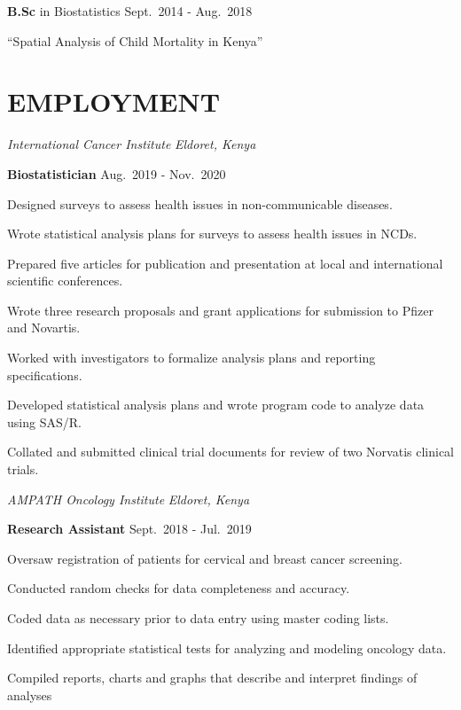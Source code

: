 \documentclass[13pt,]{article}
\providecommand{\tightlist}{%
  \setlength{\itemsep}{0pt}\setlength{\parskip}{0pt}}
\renewenvironment{itemize}{
  \begin{list}{}{
    \setlength{\leftmargin}{1.5em}
  }
}{
  \end{list}
}
\begin{document}
\begin{itemize}
\item
  \textbf{B.Sc} in Biostatistics \hfill Sept.~2014 - Aug.~2018

  \begin{itemize}
  \tightlist
  \item
    ``Spatial Analysis of Child Mortality in Kenya''
  \end{itemize}
\end{itemize}

\hypertarget{employment}{%
\section{\texorpdfstring{\textbf{EMPLOYMENT}}{EMPLOYMENT}}\label{employment}}

\emph{International Cancer Institute} \hfill \emph{Eldoret, Kenya}

\textbf{Biostatistician} \hfill Aug.~2019 - Nov.~2020

\begin{itemize}
\tightlist
\item
  Designed surveys to assess health issues in non-communicable diseases.
\item
  Wrote statistical analysis plans for surveys to assess health issues
  in NCDs.
\item
  Prepared five articles for publication and presentation at local and
  international scientific conferences.
\item
  Wrote three research proposals and grant applications for submission
  to Pfizer and Novartis.
\item
  Worked with investigators to formalize analysis plans and reporting
  specifications.
\item
  Developed statistical analysis plans and wrote program code to analyze
  data using SAS/R.
\item
  Collated and submitted clinical trial documents for review of two
  Norvatis clinical trials.
\end{itemize}

\emph{AMPATH Oncology Institute} \hfill \emph{Eldoret, Kenya}

\textbf{Research Assistant} \hfill Sept.~2018 - Jul.~2019

\begin{itemize}
\tightlist
\item
  Oversaw registration of patients for cervical and breast cancer
  screening.
\item
  Conducted random checks for data completeness and accuracy.
\item
  Coded data as necessary prior to data entry using master coding lists.
\item
  Identified appropriate statistical tests for analyzing and modeling
  oncology data.
\item
  Compiled reports, charts and graphs that describe and interpret
  findings of analyses
\end{itemize}
\end{document}
